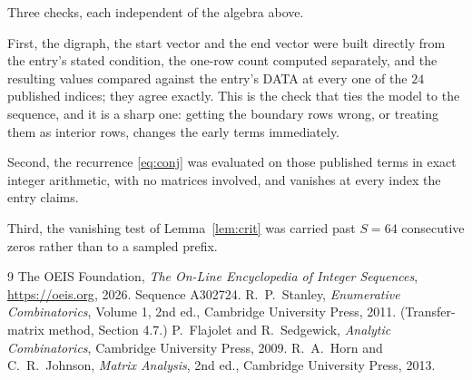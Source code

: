 \documentclass[11pt,a4paper]{article}
\theoremstyle{plain}
\theoremstyle{definition}
\begin{document}
Three checks, each independent of the algebra above.

First, the digraph, the start vector and the end vector were built directly from the
entry's stated condition, the one-row count computed separately, and the resulting values
compared against the entry's DATA at every one of the $24$ published indices; they
agree exactly. This is the check that ties the model to the sequence, and it is a sharp one:
getting the boundary rows wrong, or treating them as interior rows, changes the early terms
immediately.

Second, the recurrence \eqref{eq:conj} was evaluated on those published terms in exact
integer arithmetic, with no matrices involved, and vanishes at every index the entry claims.

Third, the vanishing test of Lemma~\ref{lem:crit} was carried past $S=64$ consecutive
zeros rather than to a sampled prefix.

\begin{thebibliography}{9}
 The OEIS Foundation, \emph{The On-Line Encyclopedia of Integer
Sequences}, \url{https://oeis.org}, 2026. Sequence A302724.
 R.~P.~Stanley, \emph{Enumerative Combinatorics}, Volume 1, 2nd ed.,
Cambridge University Press, 2011. (Transfer-matrix method, Section 4.7.)
 P.~Flajolet and R.~Sedgewick, \emph{Analytic Combinatorics}, Cambridge
University Press, 2009.
 R.~A.~Horn and C.~R.~Johnson, \emph{Matrix Analysis}, 2nd ed., Cambridge
University Press, 2013.
\end{thebibliography}
\end{document}
